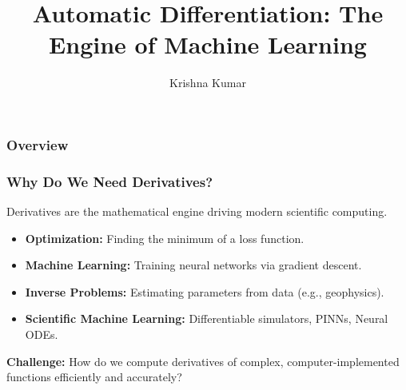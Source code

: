 \documentclass[notes]{beamer}
\title[Automatic Differentiation]{Automatic Differentiation: The Engine of Machine Learning}
\author{Krishna Kumar} %
\institute[UT Austin] %
{
University of Texas at Austin \\
\medskip
\textit{
  \url{krishnak@utexas.edu}} %
}
\date{} %
\begin{document}
\begin{frame}
\titlepage %
\end{frame}

\begin{frame}
 \frametitle{Overview}
 \tableofcontents
\end{frame}

\begin{frame}
\frametitle{Why Do We Need Derivatives?}

Derivatives are the mathematical engine driving modern scientific computing.

\begin{itemize}
    \item \textbf{Optimization:} Finding the minimum of a loss function.
    \item \textbf{Machine Learning:} Training neural networks via gradient descent.
    \item \textbf{Inverse Problems:} Estimating parameters from data (e.g., geophysics).
    \item \textbf{Scientific Machine Learning:} Differentiable simulators, PINNs, Neural ODEs.
\end{itemize}

\vspace{1cm}

\textbf{Challenge:} How do we compute derivatives of complex, computer-implemented functions efficiently and accurately?

\end{frame}
\end{document}

